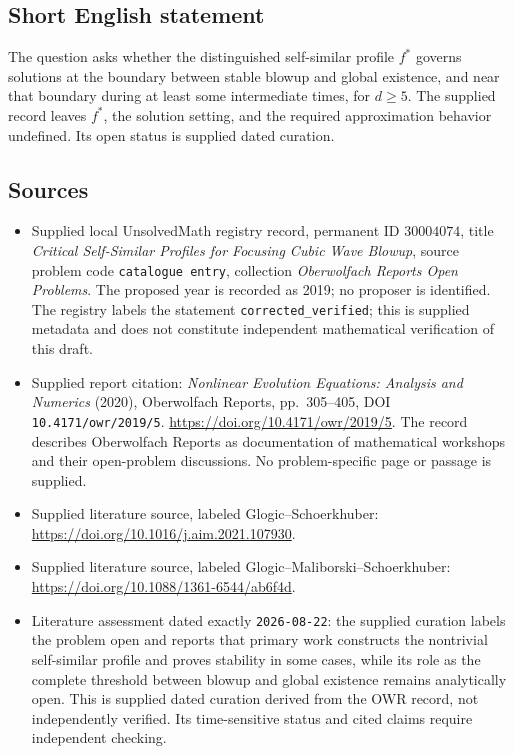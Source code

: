 \documentclass[11pt]{article}
\begin{document}
\subsection{Short English statement}
The question asks whether the distinguished self-similar profile \(f^*\) governs solutions at the boundary between stable blowup and global existence, and near that boundary during at least some intermediate times, for \(d\geq5\). The supplied record leaves \(f^*\), the solution setting, and the required approximation behavior undefined. Its open status is supplied dated curation.
\subsection{Sources}
\begin{itemize}
\item Supplied local UnsolvedMath registry record, permanent ID \(30004074\), title \emph{Critical Self-Similar Profiles for Focusing Cubic Wave Blowup}, source problem code \texttt{catalogue entry}, collection \emph{Oberwolfach Reports Open Problems}. The proposed year is recorded as 2019; no proposer is identified. The registry labels the statement \texttt{corrected\_verified}; this is supplied metadata and does not constitute independent mathematical verification of this draft.
\item Supplied report citation: \emph{Nonlinear Evolution Equations: Analysis and Numerics} (2020), Oberwolfach Reports, pp.\ 305--405, DOI \texttt{10.4171/owr/2019/5}. \url{https://doi.org/10.4171/owr/2019/5}. The record describes Oberwolfach Reports as documentation of mathematical workshops and their open-problem discussions. No problem-specific page or passage is supplied.
\item Supplied literature source, labeled Glogic--Schoerkhuber: \url{https://doi.org/10.1016/j.aim.2021.107930}.
\item Supplied literature source, labeled Glogic--Maliborski--Schoerkhuber: \url{https://doi.org/10.1088/1361-6544/ab6f4d}.
\item Literature assessment dated exactly \texttt{2026-08-22}: the supplied curation labels the problem open and reports that primary work constructs the nontrivial self-similar profile and proves stability in some cases, while its role as the complete threshold between blowup and global existence remains analytically open. This is supplied dated curation derived from the OWR record, not independently verified. Its time-sensitive status and cited claims require independent checking.
\end{itemize}
\end{document}
